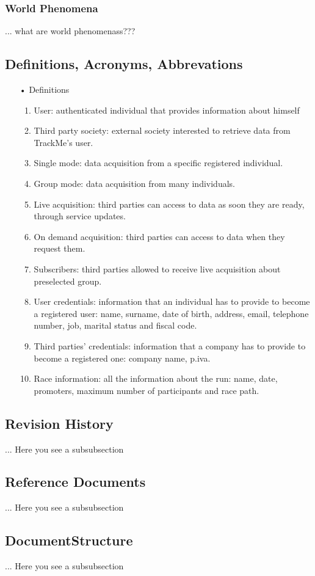 \subsubsection{World Phenomena}
... what are world phenomenass???

\subsection{Definitions, Acronyms, Abbrevations}

\begin{enumerate}
\item[•] {\Large Definitions}
	\begin{enumerate}
		\item User: authenticated individual that provides information about himself
		\item Third party society: external society interested to retrieve data from 					TrackMe's user.
		\item Single mode: data acquisition from a specific registered individual.
		\item Group mode: data acquisition from many individuals. 
		\item Live acquisition: third parties can access to data as soon they are ready, 				through service updates.
		\item On demand acquisition: third parties can access to data when they request 				them.
		\item Subscribers: third parties allowed to receive live acquisition about 						preselected	group.
		\item User credentials: information that an individual has to provide to become a 				registered user: name, surname, date of birth, address, email, telephone
			number, job, marital status and fiscal code. 
		\item Third parties’ credentials: information that a company has to provide to 					become a registered one: company name, p.iva.
		\item Race information: all the information about the run: name, date, promoters, 				maximum number of participants and race path.
	\end{enumerate}
\end{enumerate}
	
\subsection{Revision History}
... Here you see a subsubsection
\subsection{Reference Documents}
... Here you see a subsubsection
\subsection{DocumentStructure}
... Here you see a subsubsection

